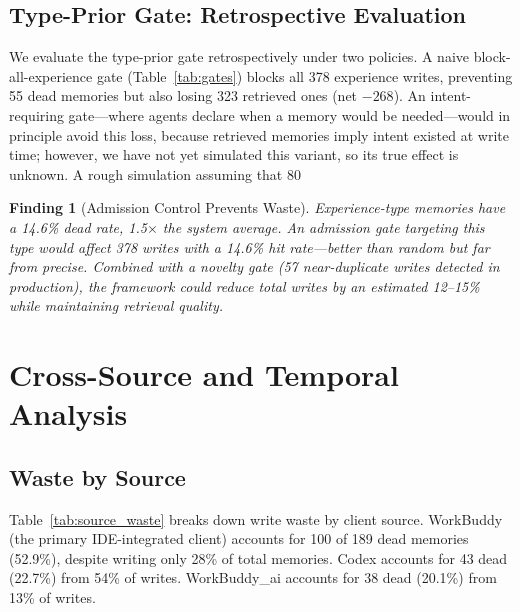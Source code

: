 \documentclass[11pt]{article}
\newtheorem{finding}{Finding}
\begin{document}
\subsection{Type-Prior Gate: Retrospective Evaluation}

We evaluate the type-prior gate retrospectively under two policies. A naive block-all-experience gate (Table~\ref{tab:gates}) blocks all 378 experience writes, preventing 55 dead memories but also losing 323 retrieved ones (net $-268$). An intent-requiring gate---where agents declare when a memory would be needed---would in principle avoid this loss, because retrieved memories imply intent existed at write time; however, we have not yet simulated this variant, so its true effect is unknown. A rough simulation assuming that 80%

\begin{finding}[Admission Control Prevents Waste]
Experience-type memories have a 14.6\% dead rate, 1.5$\times$ the system average. An admission gate targeting this type would affect 378 writes with a 14.6\% hit rate---better than random but far from precise. Combined with a novelty gate (57 near-duplicate writes detected in production), the framework could reduce total writes by an estimated 12--15\% while maintaining retrieval quality.
\end{finding}

\section{Cross-Source and Temporal Analysis}

\subsection{Waste by Source}

Table~\ref{tab:source_waste} breaks down write waste by client source. WorkBuddy (the primary IDE-integrated client) accounts for 100 of 189 dead memories (52.9\%), despite writing only 28\% of total memories. Codex accounts for 43 dead (22.7\%) from 54\% of writes. WorkBuddy\_ai accounts for 38 dead (20.1\%) from 13\% of writes.
\end{document}
